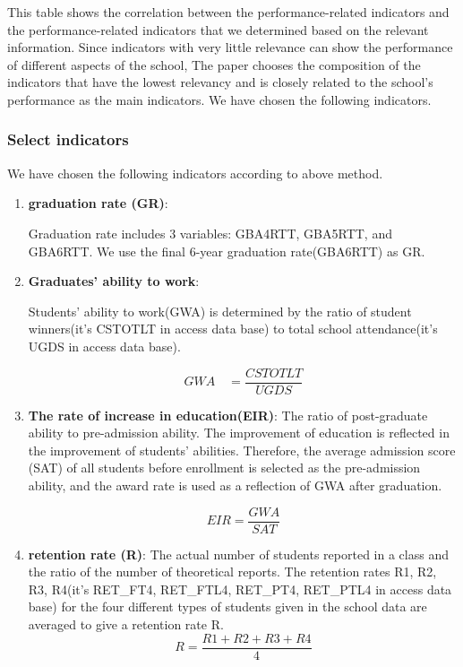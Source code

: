 \documentclass{mcmthesis}
\begin{document}
This table shows the correlation between the performance-related indicators and the performance-related indicators that we determined based on the relevant information. Since indicators with very little relevance can show the performance of different aspects of the school, The paper chooses the composition of the indicators that have the lowest relevancy and is closely related to the school's performance as the main indicators. We have chosen the following indicators.

\subsubsection{Select indicators}

We have chosen the following indicators according to above method.

\begin{enumerate}
	\item \textbf{graduation rate (GR)}: 
	
		Graduation rate includes 3 variables: GBA4RTT, GBA5RTT, and GBA6RTT. We use the final 6-year graduation rate(GBA6RTT) as GR.
		
	\item \textbf{Graduates' ability to work}:
	
		Students' ability to work(GWA) is determined by the ratio of student winners(it's CSTOTLT in access data base) to total school attendance(it's UGDS in access data base).

		\begin{equation}
			\label{GWA}
				GWA \quad = \frac{CSTOTLT}{UGDS}			
		\end{equation} 
	

	\item \textbf{The rate of increase in education(EIR)}:
		 The ratio of post-graduate ability to pre-admission ability. The improvement of education is reflected in the improvement of students' abilities. Therefore, the average admission score (SAT) of all students before enrollment is selected as the pre-admission ability, and the award rate is used as a reflection of GWA after graduation.
		 
		 \begin{equation}
		 	\label{EIR}
		 		EIR = \frac{GWA}{SAT}
		 \end{equation}

	\item \textbf{retention rate (R)}: 
		The actual number of students reported in a class and the ratio of the number of theoretical reports. The retention rates R1, R2, R3, R4(it's RET\_FT4, RET\_FTL4, RET\_PT4, RET\_PTL4 in access data base) for the four different types of students given in the school data are averaged to give a retention rate R.
		\begin{equation}
			\label{R}
				R = \frac{R1+R2+R3+R4}{4}			
		\end{equation}
\end{enumerate}
\end{document}
